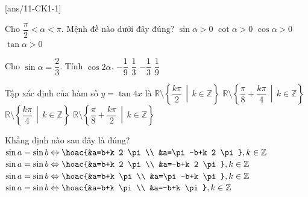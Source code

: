 \begin{name}
	{\tenchude}
	{\tendethi}
	{\tentruong}
	{\thoigian}
\end{name}
\setcounter{ex}{0}\setcounter{bt}{0}

\caulc
{}[ans/11-CK1-1]
\begin{ex}%
	Cho $\dfrac{\pi}{2}<\alpha <\pi $. Mệnh đề nào dưới đây đúng?
	\choice
	{\True $\sin\alpha > 0$}
	{$\cot\alpha > 0$}
	{$\cos\alpha > 0$}
	{$\tan\alpha > 0$}
\end{ex}
\begin{ex}%
	Cho $\sin\alpha=\dfrac{2}{3}$. Tính $\cos 2\alpha$.
	\choice
	{$-\dfrac{1}{9}$}
	{$\dfrac{1}{3}$}
	{$-\dfrac{1}{3}$}
	{\True $\dfrac{1}{9}$}
\end{ex}

\begin{ex}%
	Tập xác định của hàm số $y=\tan4x$ là
	\choice
	{$\mathbb{R}\setminus\left\{\dfrac{k\pi}{2} \,\middle|\, k\in\mathbb{Z}\right\}$}
	{\True $\mathbb{R}\setminus\left\{\dfrac{\pi}{8}+\dfrac{k\pi}{4} \,\middle|\, k\in\mathbb{Z}\right\}$}
	{$\mathbb{R}\setminus\left\{\dfrac{k\pi}{4} \,\middle|\, k\in\mathbb{Z}\right\}$}
	{$\mathbb{R}\setminus\left\{\dfrac{\pi}{8}+\dfrac{k\pi}{2}\,\middle|\, k\in\mathbb{Z}\right\}$}
\end{ex}

\begin{ex}%
	Khẳng định nào sau đây là đúng?
	\choice
	{\True $\sin a=\sin b \Leftrightarrow \hoac{&a=b+k 2 \pi \\ &a=\pi-b+k 2 \pi}, k \in \mathbb{Z}$}
	{$\sin a=\sin b \Leftrightarrow \hoac{&a=b+k 2 \pi \\ &a=-b+k 2 \pi}, k \in \mathbb{Z}$}
	{$\sin a=\sin b \Leftrightarrow \hoac{&a=b+k \pi \\ &a=\pi-b+k \pi}, k \in \mathbb{Z}$}
	{$\sin a=\sin b \Leftrightarrow \hoac{&a=b+k \pi \\ &a=-b+k \pi}, k \in \mathbb{Z}$}
\end{ex}

